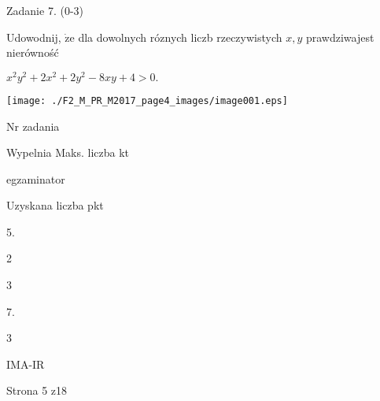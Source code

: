 \documentclass[a4paper,12pt]{article}
\begin{document}
Zadanie 7. (0-3)

Udowodnij, $\dot{\mathrm{z}}\mathrm{e}$ dla dowolnych róznych liczb rzeczywistych $x,y$ prawdziwajest nierówność

$x^{2}y^{2}+2x^{2}+2y^{2}-8xy+4>0.$
\begin{center}
\texttt{[image: ./F2\_M\_PR\_M2017\_page4\_images/image001.eps]}
\end{center}
Nr zadania

Wypelnia Maks. liczba kt

egzaminator

Uzyskana liczba pkt

5.

2

3

7.

3

IMA-IR

Strona 5 z18
\end{document}
